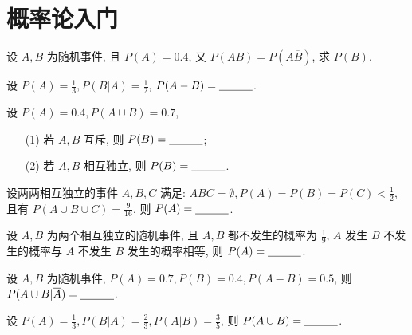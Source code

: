 \documentclass[padp]{ExBook}
\begin{document}


\maketitle 
 




\setcounter{page}{1}
\tableofcontents 
    
\clearpage 
\section{概率论入门}

\begin{qitems}

    \begin{bbox}
        \qitem   设 $A, B$ 为随机事件, 且 $P(A) = 0.4$, 又 $P(AB) = P(A\overline{B})$, 求 $P(B)$.
    \end{bbox}
    \begin{bbox}
        \qitem  设 $P(A) = \frac{1}{3}, P(B|A) = \frac{1}{2}$, $P(A-B) = \underline{\hspace{3em}}$.
    \end{bbox}
    \begin{bbox}
        \qitem   设 $P(A) = 0.4, P(A \cup B) = 0.7$,
\begin{enumerate}
    \item[(1)] 若 $A, B$ 互斥, 则 $P(B) = \underline{\hspace{3em}}$;
    \item[(2)] 若 $A, B$ 相互独立, 则 $P(B) = \underline{\hspace{3em}}$.
\end{enumerate}
    \end{bbox}
    \begin{bbox}
        \qitem  设两两相互独立的事件 $A, B, C$ 满足: $ABC = \emptyset, P(A)=P(B)=P(C) < \frac{1}{2}$, 且有 $P(A \cup B \cup C) = \frac{9}{16}$, 则 $P(A) = \underline{\hspace{3em}}$.
    \end{bbox}
    \begin{bbox}
        \qitem   设 $A, B$ 为两个相互独立的随机事件, 且 $A, B$ 都不发生的概率为 $\frac{1}{9}$, $A$ 发生 $B$ 不发生的概率与 $A$ 不发生 $B$ 发生的概率相等, 则 $P(A) = \underline{\hspace{3em}}$.
    \end{bbox}
    \begin{bbox}
        \qitem  设 $A, B$ 为随机事件, $P(A)=0.7, P(B)=0.4, P(A-B)=0.5$, 则 $P(A \cup B | \overline{A}) = \underline{\hspace{3em}}$.
    \end{bbox}
    \begin{bbox}
        \qitem  设 $P(A) = \frac{1}{3}, P(B|A) = \frac{2}{3}, P(A|B) = \frac{3}{5}$, 则 $P(A \cup B) = \underline{\hspace{3em}}$.

\end{bbox}
\end{qitems}
\end{document}
